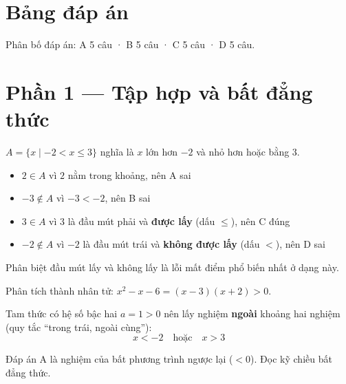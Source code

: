 \documentclass[11pt, a4paper]{article}
\begin{document}

\section*{Bảng đáp án}


\vspace{0.2cm}
\noindent Phân bố đáp án: A 5 câu · B 5 câu · C 5 câu · D 5 câu.

\section{Phần 1 — Tập hợp và bất đẳng thức}

\begin{dapan}[1 — Đáp án C]
$A=\{x \mid -2<x\le 3\}$ nghĩa là $x$ lớn hơn $-2$ và nhỏ hơn hoặc bằng $3$.

\begin{itemize}[leftmargin=1.4em, itemsep=2pt]
\item $2 \in A$ vì $2$ nằm trong khoảng, nên A sai
\item $-3 \notin A$ vì $-3 < -2$, nên B sai
\item $3 \in A$ vì $3$ là đầu mút phải và \textbf{được lấy} (dấu $\le$), nên C đúng
\item $-2 \notin A$ vì $-2$ là đầu mút trái và \textbf{không được lấy} (dấu $<$), nên D sai
\end{itemize}

 Phân biệt đầu mút lấy và không lấy là lỗi mất điểm phổ biến nhất ở dạng này.
\end{dapan}

\begin{dapan}[2 — Đáp án B]
Phân tích thành nhân tử: $x^2-x-6=(x-3)(x+2)>0$.

Tam thức có hệ số bậc hai $a=1>0$ nên lấy nghiệm \textbf{ngoài} khoảng hai nghiệm (quy tắc ``trong trái, ngoài cùng''):
\[
x<-2 \quad \text{hoặc} \quad x>3
\]

 Đáp án A là nghiệm của bất phương trình ngược lại ($<0$). Đọc kỹ chiều bất đẳng thức.
\end{dapan}
\end{document}
